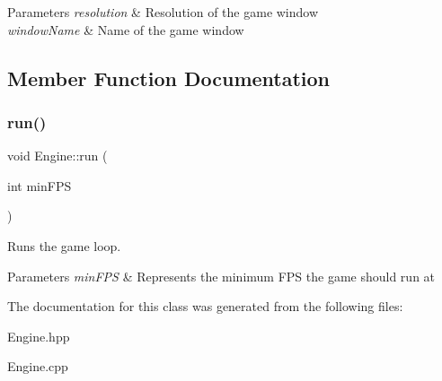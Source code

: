 \begin{DoxyParams}{Parameters}
{\em resolution} & Resolution of the game window \\
\hline
{\em window\+Name} & Name of the game window \\
\hline
\end{DoxyParams}


\subsection{Member Function Documentation}
\mbox{\label{class_engine_ac1d74c5d25b4fa5dbe9555df92f825bc}} 
\subsubsection{\texorpdfstring{run()}{run()}}
{\footnotesize\ttfamily void Engine\+::run (\begin{DoxyParamCaption}\item[{int}]{min\+F\+PS }\end{DoxyParamCaption})}



Runs the game loop. 


\begin{DoxyParams}{Parameters}
{\em min\+F\+PS} & Represents the minimum F\+PS the game should run at \\
\hline
\end{DoxyParams}


The documentation for this class was generated from the following files\+:\begin{DoxyCompactItemize}
\item 
Engine.\+hpp\item 
Engine.\+cpp\end{DoxyCompactItemize}
